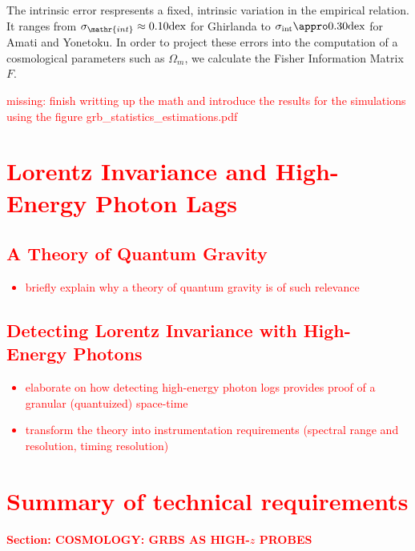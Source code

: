 \documentclass[
    aps,
    prd,
    twocolumn,
    nofootinbib,
    floatfix,
    superscriptaddress,
]{revtex4-2}
\begin{document}
The intrinsic error respresents a fixed, intrinsic variation in the empirical relation. It ranges from $\sigma_\mathr{int} \approx 0.10 \mathrm{dex}$ for Ghirlanda to $\sigma_\mathrm{int} \appro 0.30 \mathrm{dex}$ for Amati and Yonetoku. In order to project these errors into the computation of a cosmological parameters such as $\Omega_m$, we calculate the Fisher Information Matrix $F$.

\textcolor{red}{missing: finish writting up the math and introduce the results for the simulations using the figure grb_statistics_estimations.pdf



\section{Lorentz Invariance and High-Energy Photon Lags}

\subsection{A Theory of Quantum Gravity}

\begin{itemize}
	\item briefly explain why a theory of quantum gravity is of such relevance
\end{itemize}

\subsection{Detecting Lorentz Invariance with High-Energy Photons}

\begin{itemize}
	\item elaborate on how detecting high-energy photon logs provides proof of a granular (quantuized) space-time
	\item transform the theory into instrumentation requirements (spectral range and resolution, timing resolution)
\end{itemize}


\section{Summary of technical requirements}


\textbf{Section: COSMOLOGY: GRBS AS HIGH-$z$ PROBES}

}
\end{document}
